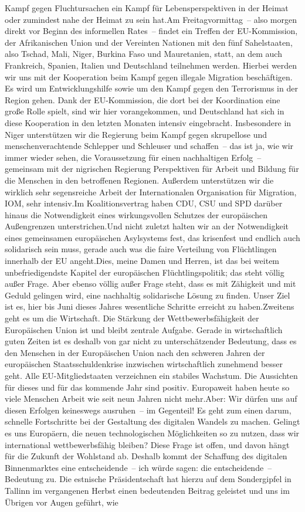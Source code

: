 \documentclass{article}
\begin{document}
Kampf gegen Fluchtursachen ein Kampf für Lebensperspektiven in der Heimat oder zumindest nahe der Heimat zu sein hat.Am Freitagvormittag – also morgen direkt vor Beginn des informellen Rates – findet ein Treffen der EU-Kommission, der Afrikanischen Union und der Vereinten Nationen mit den fünf Sahelstaaten, also Tschad, Mali, Niger, Burkina Faso und Mauretanien, statt, an dem auch Frankreich, Spanien, Italien und Deutschland teilnehmen werden. Hierbei werden wir uns mit der Kooperation beim Kampf gegen illegale Migration beschäftigen. Es wird um Entwicklungshilfe sowie um den Kampf gegen den Terrorismus in der Region gehen. Dank der EU-Kommission, die dort bei der Koordination eine große Rolle spielt, sind wir hier vorangekommen, und Deutschland hat sich in diese Kooperation in den letzten Monaten intensiv eingebracht. Insbesondere in Niger unterstützen wir die Regierung beim Kampf gegen skrupellose und menschenverachtende Schlepper und Schleuser und schaffen – das ist ja, wie wir immer wieder sehen, die Voraussetzung für einen nachhaltigen Erfolg – gemeinsam mit der nigrischen Regierung Perspektiven für Arbeit und Bildung für die Menschen in den betroffenen Regionen. Außerdem unterstützen wir die wirklich sehr segensreiche Arbeit der Internationalen Organisation für Migration, IOM, sehr intensiv.Im Koalitionsvertrag haben CDU, CSU und SPD darüber hinaus die Notwendigkeit eines wirkungsvollen Schutzes der europäischen Außengrenzen unterstrichen.Und nicht zuletzt halten wir an der Notwendigkeit eines gemeinsamen europäischen Asylsystems fest, das krisenfest und endlich auch solidarisch sein muss, gerade auch was die faire Verteilung von Flüchtlingen innerhalb der EU angeht.Dies, meine Damen und Herren, ist das bei weitem unbefriedigendste Kapitel der europäischen Flüchtlingspolitik; das steht völlig außer Frage. Aber ebenso völlig außer Frage steht, dass es mit Zähigkeit und mit Geduld gelingen wird, eine nachhaltig solidarische Lösung zu finden. Unser Ziel ist es, hier bis Juni dieses Jahres wesentliche Schritte erreicht zu haben.Zweitens geht es um die Wirtschaft. Die Stärkung der Wettbewerbsfähigkeit der Europäischen Union ist und bleibt zentrale Aufgabe. Gerade in wirtschaftlich guten Zeiten ist es deshalb von gar nicht zu unterschätzender Bedeutung, dass es den Menschen in der Europäischen Union nach den schweren Jahren der europäischen Staatsschuldenkrise inzwischen wirtschaftlich zunehmend besser geht. Alle EU-Mitgliedstaaten verzeichnen ein stabiles Wachstum. Die Aussichten für dieses und für das kommende Jahr sind positiv. Europaweit haben heute so viele Menschen Arbeit wie seit neun Jahren nicht mehr.Aber: Wir dürfen uns auf diesen Erfolgen keineswegs ausruhen – im Gegenteil! Es geht zum einen darum, schnelle Fortschritte bei der Gestaltung des digitalen Wandels zu machen. Gelingt es uns Europäern, die neuen technologischen Möglichkeiten so zu nutzen, dass wir international wettbewerbsfähig bleiben? Diese Frage ist offen, und davon hängt für die Zukunft der Wohlstand ab. Deshalb kommt der Schaffung des digitalen Binnenmarktes eine entscheidende – ich würde sagen: die entscheidende – Bedeutung zu. Die estnische Präsidentschaft hat hierzu auf dem Sondergipfel in Tallinn im vergangenen Herbst einen bedeutenden Beitrag geleistet und uns im Übrigen vor Augen geführt, wie 
\end{document}

